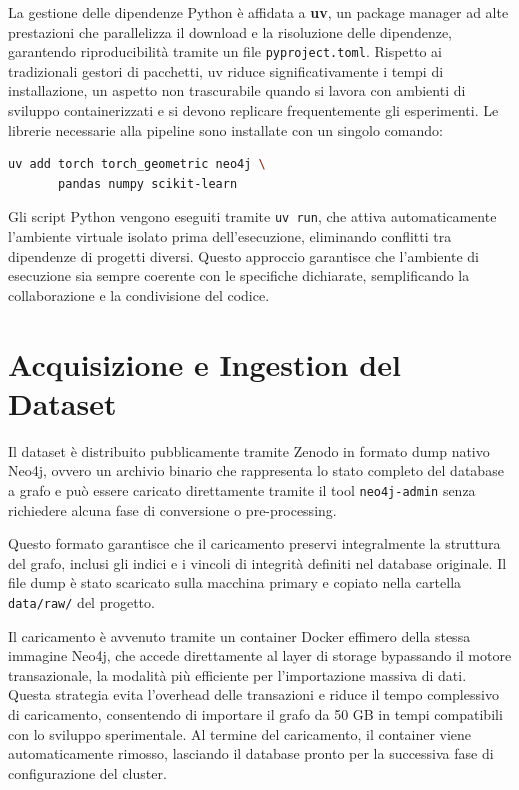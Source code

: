 La gestione delle dipendenze Python è affidata a \textbf{uv}, un package manager ad alte prestazioni che parallelizza il download e la risoluzione delle dipendenze, garantendo riproducibilità tramite un file \texttt{pyproject.toml}. Rispetto ai tradizionali gestori di pacchetti, uv riduce significativamente i tempi di installazione, un aspetto non trascurabile quando si lavora con ambienti di sviluppo containerizzati e si devono replicare frequentemente gli esperimenti. Le librerie necessarie alla pipeline sono installate con un singolo comando:

\begin{lstlisting}[language=bash, caption={Installazione delle librerie della pipeline sperimentale}]
uv add torch torch_geometric neo4j \
       pandas numpy scikit-learn
\end{lstlisting}

Gli script Python vengono eseguiti tramite \texttt{uv run}, che attiva automaticamente l'ambiente virtuale isolato prima dell'esecuzione, eliminando conflitti tra dipendenze di progetti diversi. Questo approccio garantisce che l'ambiente di esecuzione sia sempre coerente con le specifiche dichiarate, semplificando la collaborazione e la condivisione del codice.

\section{Acquisizione e Ingestion del Dataset}
Il dataset è distribuito pubblicamente tramite Zenodo \cite{pharmebinet_zenodo} in formato dump nativo Neo4j, ovvero un archivio binario che rappresenta lo stato completo del database a grafo e può essere caricato direttamente tramite il tool \texttt{neo4j-admin} senza richiedere alcuna fase di conversione o pre-processing. 

Questo formato garantisce che il caricamento preservi integralmente la struttura del grafo, inclusi gli indici e i vincoli di integrità definiti nel database originale. Il file dump è stato scaricato sulla macchina primary e copiato nella cartella \texttt{data/raw/} del progetto.

Il caricamento è avvenuto tramite un container Docker effimero della stessa immagine Neo4j, che accede direttamente al layer di storage bypassando il motore transazionale, la modalità più efficiente per l'importazione massiva di dati. Questa strategia evita l'overhead delle transazioni e riduce il tempo complessivo di caricamento, consentendo di importare il grafo da 50 GB in tempi compatibili con lo sviluppo sperimentale. Al termine del caricamento, il container viene automaticamente rimosso, lasciando il database pronto per la successiva fase di configurazione del cluster.

